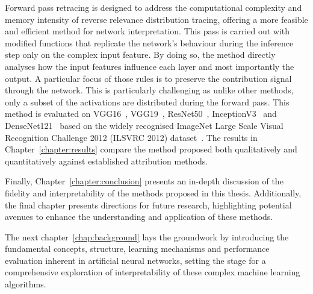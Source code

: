 Forward pass retracing is designed to address the computational complexity and memory intensity of reverse relevance distribution tracing, offering a more feasible and efficient method for network interpretation. This pass is carried out with modified functions that replicate the network's behaviour during the inference step only on the complex input feature. By doing so, the method directly analyses how the input features influence each layer and most importantly the output. A particular focus of those rules is to preserve the contribution signal through the network. This is particularly challenging as unlike other methods, only a subset of the activations are distributed during the forward pass. This method is evaluated on VGG16~\cite{SimonyanZ14a}, VGG19~\cite{SimonyanZ14a}, ResNet50~\cite{he2015deep}, InceptionV3~\cite{szegedy2015rethinking} and  DenseNet121~\cite{huang2018densely} based on the widely recognised ImageNet Large Scale Visual Recognition Challenge 2012 (ILSVRC 2012) dataset~\cite{ILSVRC15}. The results in Chapter~\ref{chapter:results} compare the method proposed both qualitatively and quantitatively against established attribution methods.


Finally, Chapter~\ref{chapter:conclusion} presents an in-depth discussion of the fidelity and interpretability of the methods proposed in this thesis. Additionally, the final chapter presents directions for future research, highlighting potential avenues to enhance the understanding and application of these methods.

The next chapter~\ref{chap:background} lays the groundwork by introducing the fundamental concepts, structure, learning mechanisms and performance evaluation inherent in artificial neural networks, setting the stage for a comprehensive exploration of interpretability of these complex machine learning algorithms.


